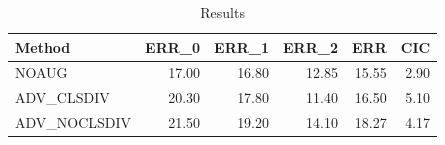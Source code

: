 \begin{table}
\caption{Results}
\label{tab:Results}
\begin{tabular}{lrrrrr}
\toprule
Method & ERR\_0 & ERR\_1 & ERR\_2 & ERR & CIC \\
\midrule
NOAUG & 17.00 & 16.80 & 12.85 & 15.55 & 2.90 \\
ADV\_CLSDIV & 20.30 & 17.80 & 11.40 & 16.50 & 5.10 \\
ADV\_NOCLSDIV & 21.50 & 19.20 & 14.10 & 18.27 & 4.17 \\
\bottomrule
\end{tabular}
\end{table}
